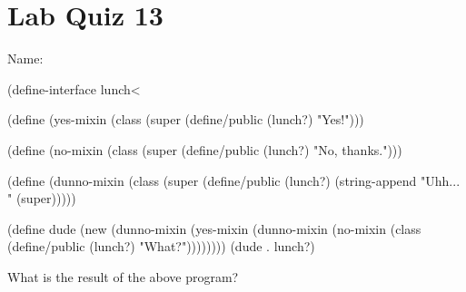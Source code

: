 \documentclass{article}
\begin{document}
\section*{Lab Quiz 13}

\bigskip
\bigskip
Name: \underline{\hspace*{4in}}

\bigskip
\setlength{\parskip}{8pt}

\begin{schemedisplay}
  (define-interface lunch<%

  (define (yes-mixin %
    (class
      (super %
      (define/public (lunch?)
        "Yes!")))

  (define (no-mixin %
    (class
      (super %
      (define/public (lunch?)
        "No, thanks.")))

  (define (dunno-mixin %
    (class
      (super %
      (define/public (lunch?)
        (string-append "Uhh... " (super)))))

  (define dude
    (new (dunno-mixin
           (yes-mixin
             (dunno-mixin
               (no-mixin
                 (class
                   (define/public (lunch?)
                     "What?"))))))))
  (dude . lunch?)
\end{schemedisplay}

\bigskip
What is the result of the above program?
\end{document}

